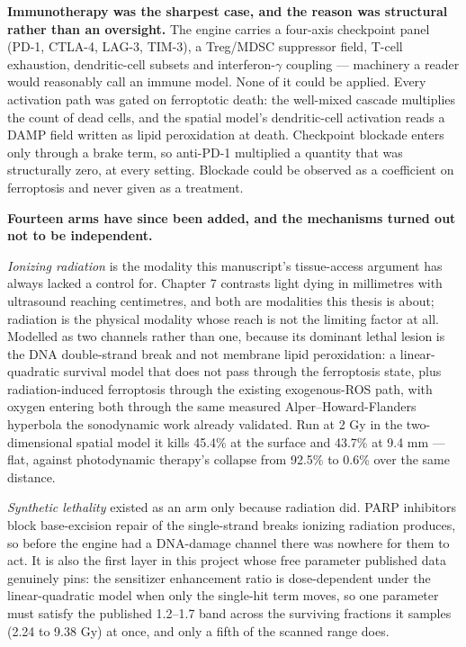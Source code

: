 \documentclass[11pt,twoside,openright]{report}
\begin{document}
\textbf{Immunotherapy was the sharpest case, and the reason was structural rather than an oversight.} The engine carries a four-axis checkpoint panel (PD-1, CTLA-4, LAG-3, TIM-3), a Treg/MDSC suppressor field, T-cell exhaustion, dendritic-cell subsets and interferon-$\gamma$ coupling --- machinery a reader would reasonably call an immune model. None of it could be applied. Every activation path was gated on ferroptotic death: the well-mixed cascade multiplies the count of dead cells, and the spatial model's dendritic-cell activation reads a DAMP field written as lipid peroxidation at death. Checkpoint blockade enters only through a brake term, so anti-PD-1 multiplied a quantity that was structurally zero, at every setting. Blockade could be observed as a coefficient on ferroptosis and never given as a treatment.

\textbf{Fourteen arms have since been added, and the mechanisms turned out not to be independent.}

\textit{Ionizing radiation} is the modality this manuscript's tissue-access argument has always lacked a control for. Chapter 7 contrasts light dying in millimetres with ultrasound reaching centimetres, and both are modalities this thesis is about; radiation is the physical modality whose reach is not the limiting factor at all. Modelled as two channels rather than one, because its dominant lethal lesion is the DNA double-strand break and not membrane lipid peroxidation: a linear-quadratic survival model that does not pass through the ferroptosis state, plus radiation-induced ferroptosis through the existing exogenous-ROS path, with oxygen entering both through the same measured Alper–Howard-Flanders hyperbola the sonodynamic work already validated. Run at 2 Gy in the two-dimensional spatial model it kills 45.4\% at the surface and 43.7\% at 9.4 mm --- flat, against photodynamic therapy's collapse from 92.5\% to 0.6\% over the same distance.

\textit{Synthetic lethality} existed as an arm only because radiation did. PARP inhibitors block base-excision repair of the single-strand breaks ionizing radiation produces, so before the engine had a DNA-damage channel there was nowhere for them to act. It is also the first layer in this project whose free parameter published data genuinely pins: the sensitizer enhancement ratio is dose-dependent under the linear-quadratic model when only the single-hit term moves, so one parameter must satisfy the published 1.2–1.7 band across the surviving fractions it samples (2.24 to 9.38 Gy) at once, and only a fifth of the scanned range does.
\end{document}
